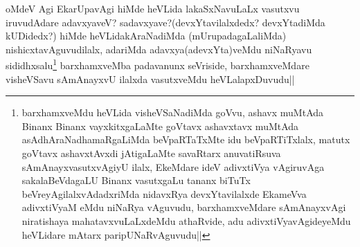 \begin{artha}
oMdeV Agi EkarUpavAgi hiMde heVLida lakaSxNavuLaLx vasutxvu iruvudAdare adavxyaveV? sadavxyave?(devxYtavilalxdedx? devxYtadiMda kUDidedx?) hiMde heVLidakAraNadiMda (mUrupadagaLaliMda) nishicxtavAguvudilalx, adariMda adavxya(adevxYta)veMdu niNaRyavu sididhxsalu\footnote{barxhamxveMdu heVLida visheVSaNadiMda goVvu, ashavx muMtAda Binanx Binanx vayxkitxgaLaMte goVtavx ashavxtavx muMtAda asAdhAraNadhamaRgaLiMda beVpaRTaTxMte idu beVpaRTiTxlalx, matutx goVtavx ashavxtAvxdi jAtigaLaMte savaRtarx anuvatiRsuva sAmAnayxvasutxvAgiyU ilalx, EkeMdare ideV adivxtiVya vAgiruvAga sakalaBeVdagaLU Binanx vasutxgaLu tananx biTuTx beVreyAgilalxvAdadxriMda nidavxRya devxYtavilalxde EkameVva adivxtiVyaM eMdu niNaRya vAguvudu, barxhamxveMdare sAmAnayxvAgi niratishaya mahatavxvuLaLxdeMdu athaRvide, adu adivxtiVyavAgideyeMdu heVLidare mAtarx paripUNaRvAguvudu||} barxhamxveMba padavanunx seVriside, barxhamxveMdare visheVSavu sAmAnayxvU ilalxda vasutxveMdu heVLalapxDuvudu||
\end{artha}

